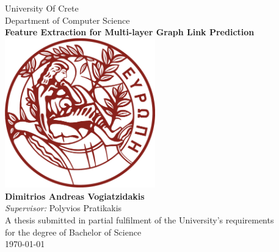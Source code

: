 \documentclass[12pt,oneside]{book}
\begin{document}

\frontmatter

\begin{titlepage}



\begin{center}
{\LARGE University Of Crete}\\[0.25cm]
{\Large Department of Computer Science}\\[1.5cm]
\linespread{1.2}\huge {\bfseries Feature Extraction for Multi-layer Graph Link Prediction}\\[1.5cm]
\linespread{1}
\includegraphics[width=6.5cm]{Thesis/images/UoC_logo.png}\\[1.5cm]
{\Large\bf  Dimitrios Andreas Vogiatzidakis}\\[1cm]
{\large \emph{Supervisor:}   Polyvios Pratikakis}\\[0.25cm]%
\vspace{\fill}
\large A thesis submitted in partial fulfilment of the University's requirements\\ for the degree of Bachelor of Science\\[1cm]
\today
\end{center}

\end{titlepage}


\end{document}
